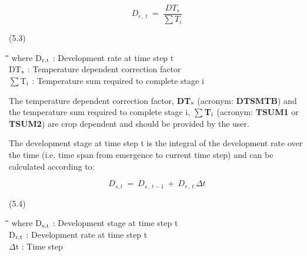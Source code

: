 \documentclass[11pt]{article}
\begin{document}
\begin{displaymath}
D _{r\, ,\, t} ~=~{\frac{DT _{s} }{\sum T _{i} }}
\end{displaymath}

 \bigskip
\strut\hfill (5.3)

\bigskip
\nwln
\begin{tabbing}
\hspace{1.27cm}\=\hspace{1.27cm}\=\hspace{1.27cm}\=\hspace{1.27cm}\=%
\hspace{1.27cm}\=\hspace{1.27cm}\=\hspace{1.27cm}\=\hspace{1.27cm}\=%
\hspace{1.27cm}\=\hspace{1.27cm}\=\kill
where\> D$_{{\rm r,t}}$\> : Development rate at time step t \> \> \> \> \> \> \> \> [d$^{{\rm -1}}$]\\
\>DT$_{{\rm s}}$\> : Temperature dependent correction factor\> \> \> \> \> \> \> \> [\degrees C]\\
\>$\sum$T$_{{\rm i}}$\> : Temperature sum required to complete stage i\> \> \> \> \> \> \> \> [\degrees C d]
\end{tabbing}

 \bigskip
The temperature dependent correction factor, {\bf DT$_{{\rm s}}$} (acronym: {\bf DTSMTB}) and the tempera\-ture sum required to complete stage i, {\bf $\sum$T$_{{\rm i}}$} (acronym: {\bf TSUM1} or {\bf TSUM2}) are crop
dependent and should be provided by the user.

\bigskip
\bigskip
The development stage at time step t is the integral of the development rate over the time
(i.e. time span from emergence to current time step) and can be calculated according to:

\begin{displaymath}
D _{s,t} ~=~ D _{s\, ,\, t-1} ~+~ D _{r\, ,\, t} \,\Delta t
\end{displaymath}

 \bigskip
\strut\hfill (5.4)

\nwln
\begin{tabbing}
\hspace{1.27cm}\=\hspace{1.27cm}\=\hspace{1.27cm}\=\hspace{1.27cm}\=%
\hspace{1.27cm}\=\hspace{1.27cm}\=\hspace{1.27cm}\=\hspace{1.27cm}\=%
\hspace{1.27cm}\=\hspace{1.27cm}\=\kill
where\> D$_{{\rm s,t}}$\> : Development stage at time step t\> \> \> \> \> \> \> \> [-]\\
\>D$_{{\rm r,t}}$\> : Development rate at time step t\> \> \> \> \> \> \> \> [d$^{{\rm -1}}$]\\
\>$\Delta$t\> : Time step\> \> \> \> \> \> \> \> [d]
\end{tabbing}
\end{document}
